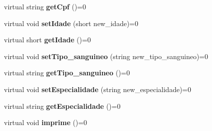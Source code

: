 \begin{DoxyCompactItemize}
virtual string {\bfseries get\+Cpf} ()=0
\item 
\mbox{\label{class_funcionario_a70c588a63c908b6c256220a872f29593}} 
virtual void {\bfseries set\+Idade} (short new\+\_\+idade)=0
\item 
\mbox{\label{class_funcionario_a8e40264dcf25c365f87857146e87c248}} 
virtual short {\bfseries get\+Idade} ()=0
\item 
\mbox{\label{class_funcionario_affa9cb9bd95c5f1b534f93bca47f7b8d}} 
virtual void {\bfseries set\+Tipo\+\_\+sanguineo} (string new\+\_\+tipo\+\_\+sanguineo)=0
\item 
\mbox{\label{class_funcionario_a8aef0be8cf13da81f577c0521c971545}} 
virtual string {\bfseries get\+Tipo\+\_\+sanguineo} ()=0
\item 
\mbox{\label{class_funcionario_ae30b7e913554bc9f679c9e3f34936721}} 
virtual void {\bfseries set\+Especialidade} (string new\+\_\+especialidade)=0
\item 
\mbox{\label{class_funcionario_a1a432cb8d8bbd6f67c1099bd41d4db7e}} 
virtual string {\bfseries get\+Especialidade} ()=0
\item 
\mbox{\label{class_funcionario_a4d3c365c20a056ad51de84e839f5127a}} 
virtual void {\bfseries imprime} ()=0
\end{DoxyCompactItemize}
